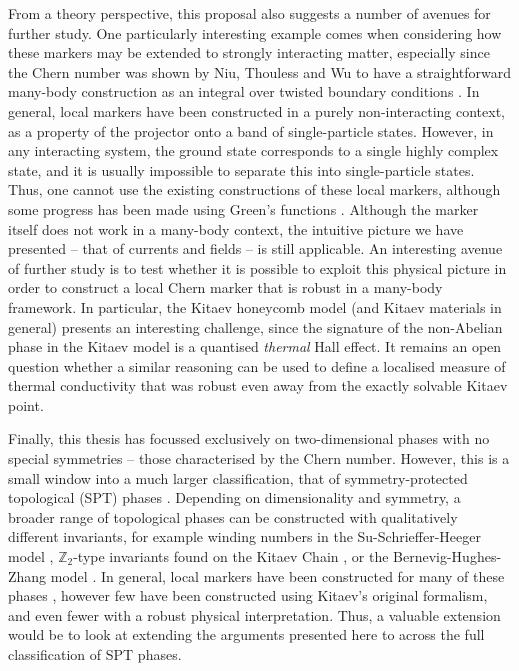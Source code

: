 From a theory perspective, this proposal also suggests a number of avenues for further study. One particularly interesting example comes when considering how these markers may be extended to strongly interacting matter, especially since the Chern number was shown by Niu, Thouless and Wu to have a straightforward many-body construction as an integral over twisted boundary conditions \cite{niu_quantized_1985}. In general, local markers have been constructed in a purely non-interacting context, as a property of the projector onto a band of single-particle states. However, in any interacting system, the ground state corresponds to a single highly complex state, and it is usually impossible to separate this into single-particle states. Thus, one cannot use the existing constructions of these local markers, although some progress has been made using Green's functions \cite{markov_local_2021}. Although the marker itself does not work in a many-body context, the intuitive picture we have presented -- that of currents and fields -- is still applicable. An interesting avenue of further study is to test whether it is possible to exploit this physical picture in order to construct a local Chern marker that is robust in a many-body framework. In particular, the Kitaev honeycomb model (and Kitaev materials in general) presents an interesting challenge, since the signature of the non-Abelian phase in the Kitaev model is a quantised \emph{thermal} Hall effect. It remains an open question whether a similar reasoning can be used to define a localised measure of thermal conductivity \cite{luttinger_theory_1964} that was robust even away from the exactly solvable Kitaev point.

Finally, this thesis has focussed exclusively on two-dimensional phases with no special symmetries -- those characterised by the Chern number. However, this is a small window into a much larger classification, that of symmetry-protected topological (SPT) phases \cite{ryu_topological_2010}. Depending on dimensionality and symmetry, a broader range of topological phases can be constructed with qualitatively different invariants, for example winding numbers in the Su-Schrieffer-Heeger model \cite{su_solitons_1979}, $\mathbb Z_2$-type invariants found on the Kitaev Chain \cite{kitaev_unpaired_2001}, or the Bernevig-Hughes-Zhang model \cite{bernevig_quantum_2006}. In general, local markers have been constructed for many of these phases \cite{chen_universal_2023,huang_theory_2018,sykes_local_2021,hannukainen_local_2022}, however few have been constructed using Kitaev's original formalism, and even fewer with a robust physical interpretation. Thus, a valuable extension would be to look at extending the arguments presented here to across the full classification of SPT phases.

